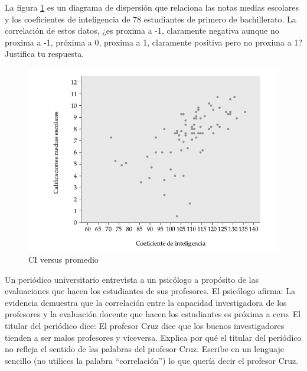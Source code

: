 \documentclass[11pt,evaluacion]{uescimat}
\begin{document}
\begin{problema}
La figura \ref{fig:fig8} es un diagrama de dispersión que relaciona las notas medias escolares y los coeficientes de inteligencia de 78 estudiantes de primero de bachillerato. La correlación de estos datos, ¿es proxima a -1, claramente negativa 
aunque no proxima a -1, próxima a 0, proxima a 1, claramente positiva pero no
proxima a 1? Justifica tu respuesta.


\begin{figure}[H]
\begin{centering}
\includegraphics[scale=0.30]{imagen9.png}
\par\end{centering}
\caption{CI versus promedio }
\label{fig:fig8}
\end{figure}


\end{problema}

\begin{problema}
Un periódico universitario entrevista a un psicólogo a propósito de las evaluaciones que hacen los estudiantes de sus profesores. El psicólogo afirma: La evidencia demuestra que la correlación entre la capacidad investigadora de los profesores y la evaluación docente que hacen los estudiantes es próxima a cero. El titular del periódico dice: El profesor Cruz dice que los buenos investigadores tienden a ser malos profesores y viceversa. Explica por qué el titular del periódico no refleja el sentido de las palabras del profesor Cruz. Escribe en un lenguaje sencillo (no utilices la palabra “correlación”) lo que quería decir el profesor Cruz.

\end{problema}

\end{document}
